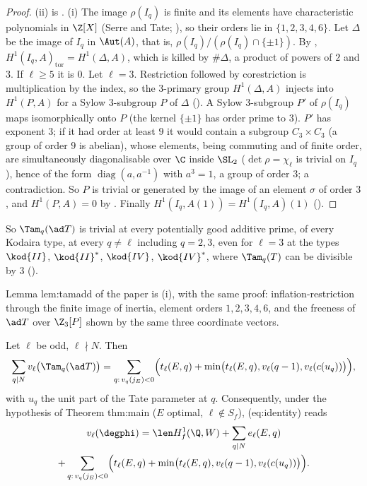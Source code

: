 \begin{proof}
(ii) is . (i) The image $\rho(I_q)$ is finite and its elements have characteristic polynomials in $\Z[X]$ (Serre and Tate; ), so
their orders lie in $\{1,2,3,4,6\}$. Let $\Delta$ be the image of $I_q$ in $\Aut(A)$, that is, $\rho(I_q)/(\rho(I_q)\cap\{\pm1\})$. By ,
$H^1(I_q,A)_{\mathrm{tor}}=H^1(\Delta,A)$, which is killed by $\#\Delta$, a product of powers of $2$ and $3$. If $\ell\ge5$ it is $0$. Let $\ell=3$. Restriction followed by corestriction is
multiplication by the index, so the $3$-primary group $H^1(\Delta,A)$ injects into $H^1(P,A)$ for a Sylow $3$-subgroup $P$ of $\Delta$ (). A Sylow $3$-subgroup $P'$ of
$\rho(I_q)$ maps isomorphically onto $P$ (the kernel $\{\pm1\}$ has order prime to $3$). $P'$ has exponent $3$; if it had order at least $9$ it would contain a subgroup $C_3\times C_3$
(a group of order $9$ is abelian), whose elements, being commuting and of finite order, are simultaneously diagonalisable over $\C$ inside $\SL_2$ ($\det\rho=\chi_\ell$ is trivial
on $I_q$), hence of the form $\operatorname{diag}(a,a^{-1})$ with $a^3=1$, a group of order $3$; a contradiction. So $P$ is trivial or generated by the image of an element $\sigma$ of order
$3$, and $H^1(P,A)=0$ by . Finally $H^1(I_q,A(1))=H^1(I_q,A)(1)$ ().
\end{proof}

So $\Tam_q(\ad T)$ is trivial at every potentially good additive prime, of every Kodaira type, at every $q\ne\ell$ including $q=2,3$, even for $\ell=3$ at the types $\kod{II}$,
$\kod{II}^*$, $\kod{IV}$, $\kod{IV}^*$, where $\Tam_q(T)$ can be divisible by $3$ ().

\begin{paperlink}
Lemma lem:tamadd of the paper is (i), with the same proof: inflation-restriction through the finite image of inertia, element orders $1,2,3,4,6$, and the
freeness of $\ad T$ over $\Z_3[P]$ shown by the same three coordinate vectors.
\end{paperlink}

\begin{corollary}\label{cor:blochkato:explicit-identity}
Let $\ell$ be odd, $\ell\nmid N$. Then
\[
\sum_{q\mid N}v_\ell\bigl(\Tam_q(\ad T)\bigr)=\sum_{q:\,v_q(j_E)<0}\Bigl(t_\ell(E,q)+\min\bigl(t_\ell(E,q),v_\ell(q-1),v_\ell(c(u_q))\bigr)\Bigr),
\]
with $u_q$ the unit part of the Tate parameter at $q$. Consequently, under the hypothesis of Theorem thm:main ($E$ optimal, $\ell\notin S_f$), (eq:identity) reads
\begin{multline*}
v_\ell(\degphi)=\len H^1_f(\Q,W)+\sum_{q\mid N}e_\ell(E,q)\\
+\sum_{q:\,v_q(j_E)<0}\Bigl(t_\ell(E,q)+\min\bigl(t_\ell(E,q),v_\ell(q-1),v_\ell(c(u_q))\bigr)\Bigr).
\end{multline*}
\end{corollary}

